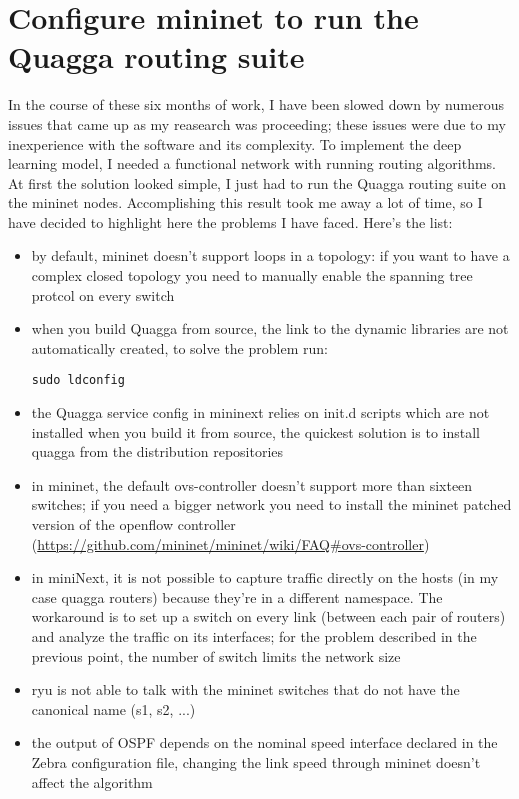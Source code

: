 \chapter{Configure mininet to run the Quagga routing suite}

In the course of these six months of work, I have been slowed down by numerous issues that came up as my reasearch was proceeding; these issues were due to my inexperience with the software and its complexity. To implement the deep learning model, I needed a functional network with running routing algorithms. At first the solution looked simple, I just had to run the Quagga routing suite on the mininet nodes. Accomplishing this result took me away a lot of time, so I have decided to highlight here the problems I have faced. Here's the list:
\begin{itemize}
\item by default, mininet doesn't support loops in a topology: if you want to have a complex closed topology you need to manually enable the spanning tree protcol on every switch
\item when you build Quagga from source, the link to the dynamic libraries are not automatically created, to solve the problem run:
\begin{lstlisting}
sudo ldconfig
\end{lstlisting}
\item the Quagga service config in mininext relies on init.d scripts which are not installed when you build it from source, the quickest solution is to install quagga from the distribution repositories
\item in mininet, the default ovs-controller doesn't support more than sixteen switches; if you need a bigger network you need to install the mininet patched version of the openflow controller (\url{https://github.com/mininet/mininet/wiki/FAQ#ovs-controller})
\item in miniNext, it is not possible to capture traffic directly on the hosts (in my case quagga routers) because they’re in a different namespace. The workaround is to set up a switch on every link (between each pair of routers) and analyze the traffic on its interfaces; for the problem described in the previous point, the number of switch limits the network size
\item ryu is not able to talk with the mininet switches that do not have the canonical name (s1, s2, ...)
\item the output of OSPF depends on the nominal speed interface declared in the Zebra configuration file, changing the link speed through mininet doesn't affect the algorithm
\end{itemize}